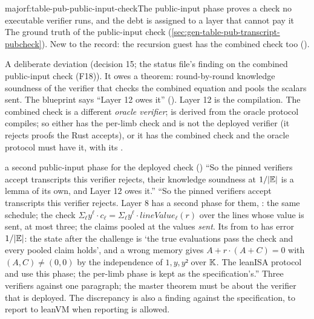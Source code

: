 \begin{finding}{major}{f:table-pub-public-input-check}{The public-input phase proves a check no executable verifier runs, and the debt is assigned to a layer that cannot pay it}
 The ground truth of the public-input check
(\cref{sec:gen-table-pub-transcript-pubcheck}). New to the record: the recursion guest has the
combined check too ().

 A deliberate deviation (decision 15; the status file's finding on the
combined public-input check (F18)). It owes a theorem: round-by-round knowledge soundness of the
verifier that checks the combined equation and pools the scalars sent. The blueprint says
``Layer 12 owes it'' (). Layer 12 is the compilation. The combined check is a
different \emph{oracle verifier};  is derived from the oracle
protocol  compiles; so either  has the per-limb check and is not the
deployed verifier (it rejects proofs the Rust accepts), or it has the combined check and the
oracle protocol must have it, with its .

\begin{change}{a second public-input phase for the deployed check}
\asis () ``So the pinned verifiers accept transcripts this verifier rejects,
their knowledge soundness at $1/|\mathbb{E}|$ is a lemma of its own, and Layer 12 owes it.''
\asproposed ``So the pinned verifiers accept transcripts this verifier rejects. Layer 8 has a
second phase for them, : the same schedule; the check
$Σ_ℓ y^ℓ·c_ℓ = Σ_ℓ y^ℓ·\mathit{lineValue}_ℓ(r)$ over the lines whose value is sent, at most
three; the claims pooled at the values \emph{sent}. Its  from
 to  has error $1/|\mathbb{E}|$: the state after the challenge is `the
true evaluations pass the check and every pooled claim holds', and a wrong memory gives
$A + r·(A + C) = 0$ with $(A, C) ≠ (0, 0)$ by the independence of $1, y, y²$ over $\mathbb{K}$. The
leanISA protocol and  use this phase; the per-limb phase is kept as the
specification's.''
\reason Three verifiers against one paragraph; the master theorem must be about the verifier that
is deployed. The discrepancy is also a finding against the specification, to report to leanVM
when reporting is allowed.
\end{change}
\end{finding}

